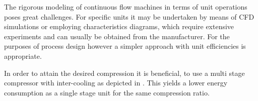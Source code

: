         The rigorous modeling of continuous flow machines in terms of unit operations poses great challenges.
        For specific units it may be undertaken by means of CFD simulations or employing characteristics diagrams,
        which require extensive experiments and can usually be obtained from the manufacturer.
        For the purposes of process design however a simpler approach with unit efficiencies is appropriate.

        In order to attain the desired compression it is beneficial, to use a multi stage compressor with
        inter-cooling as depicted in . This yields a lower energy consumption
        as a single stage unit for the same compression ratio.


%
%
%

